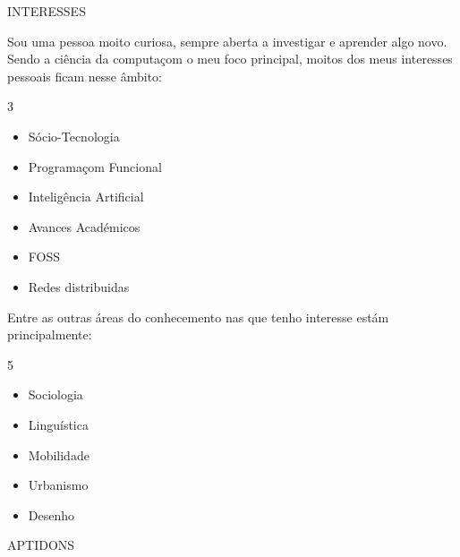 \documentclass [10pt, a4paper] {extarticle}
\newcommand{\sectionlinethickness} {0.5 pt }
\newcommand{\leftcolumwidth} {0.15 }
\newcommand{\rightcolumwidth}{ 0.84 }
\newcommand {\sectiontitle}[1] {
  \vspace*{-10px}
  \begin {flushleft}
  \begin {minipage}[c]{\leftcolumwidth\textwidth}
    \begin {flushright}
      \!\MakeUppercase {#1}
      \hspace* {10px}
    \end {flushright}
  \end {minipage}
  \begin{minipage}[c]{\rightcolumwidth\textwidth}
    \begin {tikzpicture}[remember picture, overlay,blend mode=multiply]
      \draw [line width=\sectionlinethickness, namelines] (0,0) -- (15,0);
    \end {tikzpicture}
  \end{minipage}
  \end {flushleft}
}
\begin{document}

  \sectiontitle {Interesses}
  \vspace{-15px}

  \begin {flushright}
  \begin {minipage} [t] {\rightcolumwidth\textwidth}
      Sou uma pessoa moito curiosa, sempre aberta a investigar e aprender algo novo. Sendo a ciência da computaçom o meu foco principal, moitos dos meus interesses pessoais ficam nesse âmbito:

      \vspace {-8px}
      \begin{multicols}{3}
      \begin {itemize} [noitemsep]
        \item Sócio-Tecnologia
        \item Programaçom Funcional
        \item Inteligência Artificial
        \item Avances Académicos
        \item FOSS
        \item Redes distribuidas
      \end {itemize}
      \end{multicols}

      \vspace{-5px}
      Entre as outras áreas do conhecemento nas que tenho interesse estám principalmente:

      \vspace{-8px}
      \begin{multicols}{5}
      \begin {itemize} [noitemsep]
        \item Sociologia
        \item Linguística
        \item Mobilidade
        \item Urbanismo
        \item Desenho
      \end {itemize}
      \end{multicols}

  \end {minipage}
  \end {flushright}


  \sectiontitle {aptidons}
  \vspace{-15px}
\end{document}
